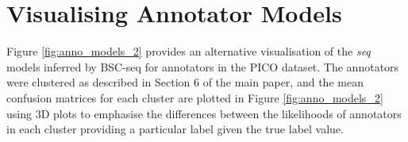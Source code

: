 \documentclass[11pt,a4paper]{article}
\begin{document}
\section{Visualising Annotator Models}

Figure \ref{fig:anno_models_2} provides an alternative visualisation of the \textit{seq} models inferred by BSC-seq for annotators in the PICO dataset.
The annotators were clustered as described in Section 6 of the main paper,
and the mean confusion matrices for each cluster are plotted in Figure \ref{fig:anno_models_2} using 3D plots to emphasise the differences between 
the likelihoods of annotators in each cluster providing a particular label 
given the true label value.



%
% 



%
\end{document}
